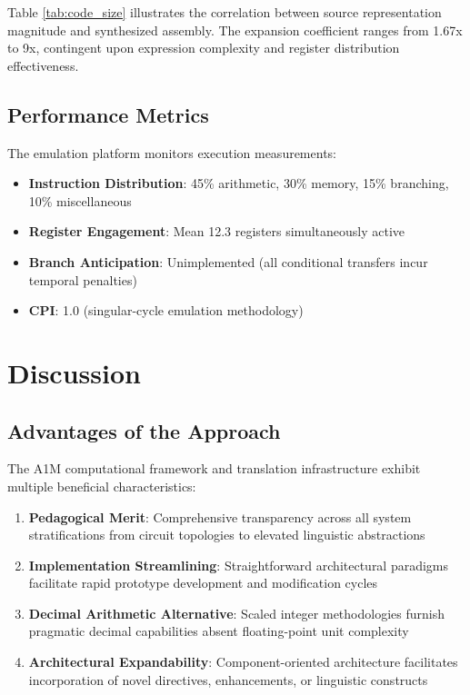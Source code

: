 \documentclass[conference,10pt,twocolumn]{IEEEtran}
\begin{document}
Table \ref{tab:code_size} illustrates the correlation between source representation magnitude and synthesized assembly. The expansion coefficient ranges from 1.67x to 9x, contingent upon expression complexity and register distribution effectiveness.

\subsection{Performance Metrics}

The emulation platform monitors execution measurements:

\begin{itemize}
\item \textbf{Instruction Distribution}: 45\% arithmetic, 30\% memory, 15\% branching, 10\% miscellaneous
\item \textbf{Register Engagement}: Mean 12.3 registers simultaneously active
\item \textbf{Branch Anticipation}: Unimplemented (all conditional transfers incur temporal penalties)
\item \textbf{CPI}: 1.0 (singular-cycle emulation methodology)
\end{itemize}

\section{Discussion}

\subsection{Advantages of the Approach}

The A1M computational framework and translation infrastructure exhibit multiple beneficial characteristics:

\begin{enumerate}
\item \textbf{Pedagogical Merit}: Comprehensive transparency across all system stratifications from circuit topologies to elevated linguistic abstractions
\item \textbf{Implementation Streamlining}: Straightforward architectural paradigms facilitate rapid prototype development and modification cycles
\item \textbf{Decimal Arithmetic Alternative}: Scaled integer methodologies furnish pragmatic decimal capabilities absent floating-point unit complexity
\item \textbf{Architectural Expandability}: Component-oriented architecture facilitates incorporation of novel directives, enhancements, or linguistic constructs
\end{enumerate}
\end{document}

